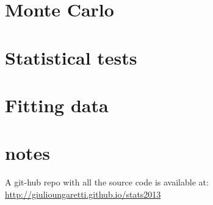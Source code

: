 \documentclass[twocolumn]{article}
\begin{document}
\section{Monte Carlo} %
\label{sec:monte_carlo}


\section{Statistical tests} %
\label{sec:statistical_tests}



\section{Fitting data} %
\label{sec:fitting_data}

\section{notes}
A git-hub repo with all the source code is available at:
\url{http://giulioungaretti.github.io/stats2013}
\end{document}

